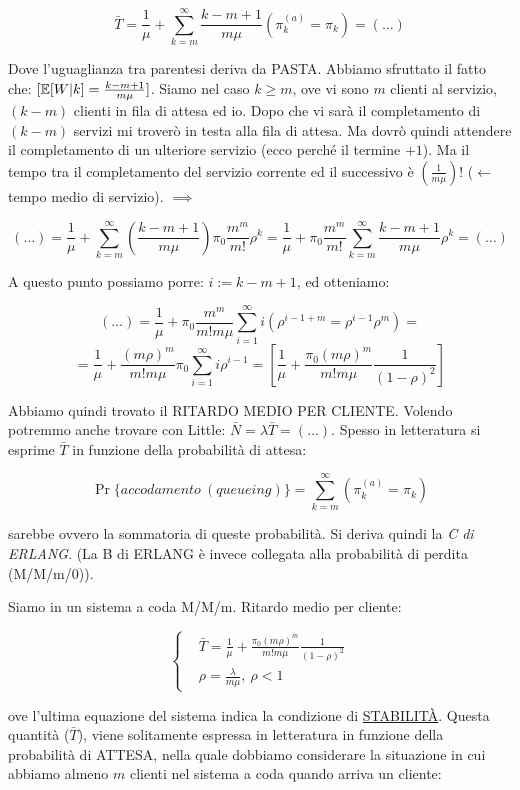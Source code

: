 \[	
	\bar{T} = \frac{1}{\mu} + \sum_{k=m}^\infty{\frac{k-m+1}{m\mu}(\pi_k^{(a)}=\pi_k)} = (\dots)
\]

Dove l'uguaglianza tra parentesi deriva da PASTA. Abbiamo sfruttato il fatto che: $[\operatorname{\mathbb{E}}[W|k] = \frac{k-m+1}{m\mu}]$. Siamo nel caso $k\geq m$, ove vi sono $m$ clienti al servizio, $(k-m)$ clienti in fila di attesa ed io. Dopo che vi sarà il completamento di $(k-m)$ servizi mi troverò in testa alla fila di attesa. Ma dovrò quindi attendere il completamento di un ulteriore servizio (ecco perché il termine $+1$). Ma il tempo tra il completamento del servizio corrente ed il successivo è $(\frac{1}{m\mu})$! ($\leftarrow$ tempo medio di servizio). $\implies$

\[
	(\dots) = \frac{1}{\mu} + \sum_{k=m}^\infty{(\frac{k-m+1}{m\mu})\pi_0\frac{m^m}{m!}\rho^k} = \frac{1}{\mu} + \pi_0\frac{m^m}{m!}\sum_{k=m}^\infty{\frac{k-m+1}{m\mu}\rho^k} = (\dots)
\]

A questo punto possiamo porre: $i := k-m+1$, ed otteniamo:

\[
	(\dots) = \frac{1}{\mu} + \pi_0\frac{m^m}{m!m\mu}\sum_{i=1}^\infty{i(\rho^{i-1+m} = \rho^{i-1}\rho^m)} =
\]
\[
	= \frac{1}{\mu} + \frac{(m\rho)^m}{m!m\mu}\pi_0\sum_{i=1}^\infty{i\rho^{i-1}} = [\frac{1}{\mu} + \frac{\pi_0(m\rho)^m}{m!m\mu} \frac{1}{(1-\rho)^2}]
\]

Abbiamo quindi trovato il RITARDO MEDIO PER CLIENTE. Volendo potremmo anche trovare con Little: $\bar{N}=\lambda\bar{T} = (\dots)$. Spesso in letteratura si esprime $\bar{T}$ in funzione della probabilità di attesa:

\[
	\Pr\{accodamento\ (queueing)\} = \sum_{k=m}^\infty{(\pi_k^{(a)}=\pi_k)}
\]

sarebbe ovvero la sommatoria di queste probabilità. Si deriva quindi la \textit{C di ERLANG}. (La B di ERLANG è invece collegata alla probabilità di perdita (M/M/m/0)). 

Siamo in un sistema a coda M/M/m. Ritardo medio per cliente:

\[
	\left\{
	\begin{aligned}
	&\bar{T} = \frac{1}{\mu} + \frac{\pi_0(m\rho)^m}{m!m\mu} \frac{1}{(1-\rho)^2}\\
	&\rho = \frac{\lambda}{m\mu},\ \rho<1
	\end{aligned}
	\right.
\]

ove l'ultima equazione del sistema indica la condizione di \underline{STABILIT\`A}. Questa quantità ($\bar{T}$), viene solitamente espressa in letteratura in funzione della probabilità di ATTESA, nella quale dobbiamo considerare la situazione in cui abbiamo almeno $m$ clienti nel sistema a coda quando arriva un cliente:

